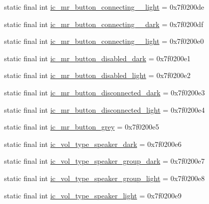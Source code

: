 \begin{CompactItemize}
\item 
static final int \hyperlink{classandroid_1_1support_1_1v7_1_1palette_1_1_r_1_1drawable_93f22b6df155b22928ed0d120d9b2dff}{ic\_\-mr\_\-button\_\-connecting\_\_\-light} = 0x7f0200de
\item 
static final int \hyperlink{classandroid_1_1support_1_1v7_1_1palette_1_1_r_1_1drawable_3c9b6f6bb4578bbb95e89e584ba70082}{ic\_\-mr\_\-button\_\-connecting\_\_\-dark} = 0x7f0200df
\item 
static final int \hyperlink{classandroid_1_1support_1_1v7_1_1palette_1_1_r_1_1drawable_effda0b5a2e140b7456a32f356d9c6d5}{ic\_\-mr\_\-button\_\-connecting\_\_\-light} = 0x7f0200e0
\item 
static final int \hyperlink{classandroid_1_1support_1_1v7_1_1palette_1_1_r_1_1drawable_9d6a3ed1d6a099a2c9c3e033e74fd8fc}{ic\_\-mr\_\-button\_\-disabled\_\-dark} = 0x7f0200e1
\item 
static final int \hyperlink{classandroid_1_1support_1_1v7_1_1palette_1_1_r_1_1drawable_996a153d75daab972268f503740955f1}{ic\_\-mr\_\-button\_\-disabled\_\-light} = 0x7f0200e2
\item 
static final int \hyperlink{classandroid_1_1support_1_1v7_1_1palette_1_1_r_1_1drawable_1a1e6f32dad4f8d0965077210db4f3bb}{ic\_\-mr\_\-button\_\-disconnected\_\-dark} = 0x7f0200e3
\item 
static final int \hyperlink{classandroid_1_1support_1_1v7_1_1palette_1_1_r_1_1drawable_d299a774bfc4403d73bd18fa501deab7}{ic\_\-mr\_\-button\_\-disconnected\_\-light} = 0x7f0200e4
\item 
static final int \hyperlink{classandroid_1_1support_1_1v7_1_1palette_1_1_r_1_1drawable_44bcd61306314fa760b0029c3d2a4231}{ic\_\-mr\_\-button\_\-grey} = 0x7f0200e5
\item 
static final int \hyperlink{classandroid_1_1support_1_1v7_1_1palette_1_1_r_1_1drawable_3645f26ca079de31524ef8d568813bdc}{ic\_\-vol\_\-type\_\-speaker\_\-dark} = 0x7f0200e6
\item 
static final int \hyperlink{classandroid_1_1support_1_1v7_1_1palette_1_1_r_1_1drawable_733a63d580757136224f286b8f829f6e}{ic\_\-vol\_\-type\_\-speaker\_\-group\_\-dark} = 0x7f0200e7
\item 
static final int \hyperlink{classandroid_1_1support_1_1v7_1_1palette_1_1_r_1_1drawable_44a46009084774ed777fd4e5626b8321}{ic\_\-vol\_\-type\_\-speaker\_\-group\_\-light} = 0x7f0200e8
\item 
static final int \hyperlink{classandroid_1_1support_1_1v7_1_1palette_1_1_r_1_1drawable_35ab64e909f5582e46d8e47bb46151c6}{ic\_\-vol\_\-type\_\-speaker\_\-light} = 0x7f0200e9

\end{CompactItemize}

